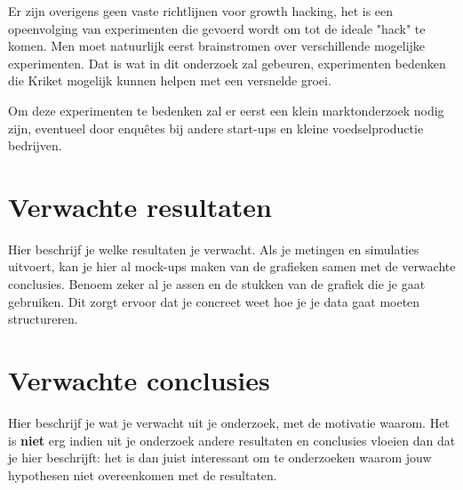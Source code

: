 Er zijn overigens geen vaste richtlijnen voor growth hacking, het is een opeenvolging van experimenten die gevoerd wordt om tot de ideale "hack" te komen. Men moet natuurlijk eerst brainstromen over verschillende mogelijke experimenten. Dat is wat in dit onderzoek zal gebeuren, experimenten bedenken die Kriket mogelijk kunnen helpen met een versnelde groei.

Om deze experimenten te bedenken zal er eerst een klein marktonderzoek nodig zijn, eventueel door enquêtes bij andere start-ups en kleine voedselproductie bedrijven. 


\section{Verwachte resultaten}
\label{sec:verwachte_resultaten}

Hier beschrijf je welke resultaten je verwacht. Als je metingen en simulaties uitvoert, kan je hier al mock-ups maken van de grafieken samen met de verwachte conclusies. Benoem zeker al je assen en de stukken van de grafiek die je gaat gebruiken. Dit zorgt ervoor dat je concreet weet hoe je je data gaat moeten structureren.

\section{Verwachte conclusies}
\label{sec:verwachte_conclusies}

Hier beschrijf je wat je verwacht uit je onderzoek, met de motivatie waarom. Het is \textbf{niet} erg indien uit je onderzoek andere resultaten en conclusies vloeien dan dat je hier beschrijft: het is dan juist interessant om te onderzoeken waarom jouw hypothesen niet overeenkomen met de resultaten.

